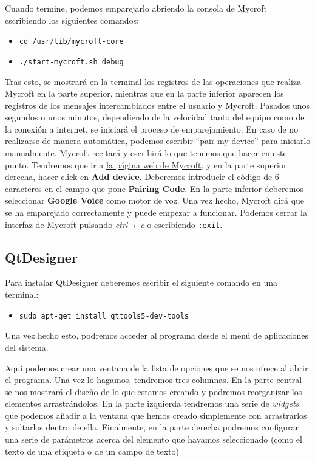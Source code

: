 Cuando termine, podemos emparejarlo abriendo la consola de Mycroft escribiendo los siguientes comandos:
\begin{itemize}
    \item \texttt{cd /usr/lib/mycroft-core}
    \item \texttt{./start-mycroft.sh debug}
\end{itemize}

Tras esto, se mostrará en la terminal los registros de las operaciones que realiza Mycroft en la parte superior, mientras que en la parte inferior aparecen los registros de los mensajes intercambiados entre el usuario y Mycroft. Pasados unos segundos o unos minutos, dependiendo de la velocidad tanto del equipo como de la conexión a internet, se iniciará el proceso de emparejamiento. En caso de no realizarse de manera automática, podemos escribir ``pair my device'' para iniciarlo manualmente.
Mycroft recitará y escribirá lo que tenemos que hacer en este punto. Tendremos que ir a \href{https://mycroft.ai}{la página web de Mycroft}, y en la parte superior derecha, hacer click en \textbf{Add device}. Deberemos introducir el código de 6 caracteres en el campo que pone \textbf{Pairing Code}. En la parte inferior deberemos seleccionar \textbf{Google Voice} como motor de voz.
Una vez hecho, Mycroft dirá que se ha emparejado correctamente y puede empezar a funcionar. Podemos cerrar la interfaz de Mycroft pulsando \textit{ctrl + c} o escribiendo \texttt{:exit}.

\subsection{QtDesigner}
Para instalar QtDesigner deberemos escribir el siguiente comando en una terminal:
\begin{itemize}
    \item \texttt{sudo apt-get install qttools5-dev-tools}
\end{itemize}
Una vez hecho esto, podremos acceder al programa desde el menú de aplicaciones del sistema.

Aquí podemos crear una ventana de la lista de opciones que se nos ofrece al abrir el programa. Una vez lo hagamos, tendremos tres columnas. En la parte central se nos mostrará el diseño de lo que estamos creando y podremos reorganizar los elementos arrastrándolos. En la parte izquierda tendremos una serie de \textit{widgets} que podemos añadir a la ventana que hemos creado simplemente con arrastrarlos y soltarlos dentro de ella. Finalmente, en la parte derecha podremos configurar una serie de parámetros acerca del elemento que hayamos seleccionado (como el texto de una etiqueta o de un campo de texto)

